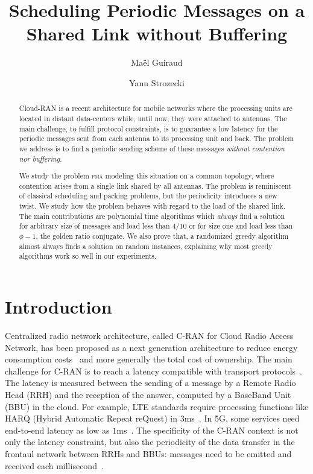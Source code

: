 \documentclass[a4paper,UKenglish,cleveref, autoref, thm-restate]{lipics-v2019}
\title{Scheduling Periodic Messages on a Shared Link without Buffering} %
\author{Ma\"el Guiraud}{David Laboratory, UVSQ, France \and Nokia Bell Labs, France}{mael.guiraud@uvsq.fr}{}{}
\author{Yann Strozecki}{David Laboratory, UVSQ, France }{yann.strozecki@uvsq.fr}{}{}%
\newcommand\pma{\textsc{pma}\xspace}
\begin{document}
\maketitle


\begin{abstract}
Cloud-RAN is a recent architecture for mobile networks where the processing units are located in distant data-centers while, until now, they were attached to antennas. The main challenge, to fulfill protocol constraints, is to guarantee a low latency for the periodic messages sent from each antenna to its processing unit and back. The problem we address is to find a periodic sending scheme of these messages \emph{without contention nor buffering}.

We study the problem \pma modeling this situation on a common topology, where contention arises from a single link shared by all antennas. The problem is reminiscent of classical scheduling and packing problems, but the periodicity introduces a new twist. We study how the problem behaves with regard to the load of the shared link. 
The main contributions are polynomial time algorithms which \emph{always} find a solution for arbitrary size of messages and load less than $4/10$ or for size one and load less than $\phi - 1$, the golden ratio conjugate. We also prove that, a randomized greedy algorithm almost always finds a solution on random instances, explaining why most greedy algorithms work so well in our experiments.
\end{abstract}


\section{Introduction}

Centralized radio network architecture, called C-RAN for Cloud Radio Access Network, has been proposed as a next generation architecture to reduce energy consumption costs~\cite{mobile2011c} and more generally the total cost of ownership. The main challenge for C-RAN is to reach a latency compatible with transport protocols~\cite{ieeep802}. The latency is measured between the sending of a message by a Remote Radio Head (RRH) and the reception of the answer, computed by a BaseBand Unit (BBU) in the cloud. For example, LTE standards require processing functions like HARQ (Hybrid Automatic Repeat reQuest) in $3$ms~\cite{bouguen2012lte}. In 5G, some services need end-to-end latency as low as $1$ms~\cite{3gpp5g,boccardi2014five}. The specificity of the C-RAN context is not only the latency constraint, but also the periodicity of the data transfer in the frontaul network between RRHs and BBUs: messages need to be emitted and received each millisecond~\cite{bouguen2012lte}. 
\end{document}

